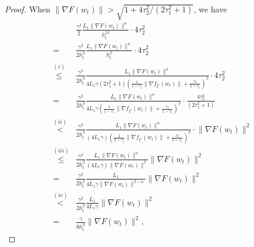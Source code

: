 \documentclass[10pt,a4paper]{amsart}
\begin{document}
\begin{proof}
    When $\big \|\nabla F(w_t) \big \| > \sqrt{1+{4\tau_2^2}/{(2\tau_1^2+1)}}$, we have
    \begin{align}
        &\frac{\gamma^2}{2} \frac{L_1 \big \|\nabla F(w_t) \big \|^{\alpha}}{h_t^{2\beta}}\cdot {4\tau_2^2} \nonumber\\
        =& \frac{\gamma^2}{2h_t^{\beta}} \frac{L_1 \big \|\nabla F(w_t) \big \|^{\alpha}}{h_t^{\beta}}\cdot {4\tau_2^2} \nonumber \\
        \overset{(i)}{\leq}&\frac{\gamma^2}{2h_t^{\beta}} \frac{L_1 \big \|\nabla F(w_t) \big \|^{\alpha}}{4L_1\gamma(2\tau_1^2+1)(\frac{1}{1-\tau_1}\|\nabla f_{\xi'}(w_t) \|+\frac{\tau_2}{1-\tau_1})^{\beta}}\cdot 4\tau_2^2 \nonumber \\
        =& \frac{\gamma^2}{2h_t^{\beta}} \frac{L_1 \big \|\nabla F(w_t) \big \|^{\alpha}}{4L_1\gamma(\frac{1}{1-\tau_1}\|\nabla f_{\xi'}(w_t) \|+\frac{\tau_2}{1-\tau_1})^{\beta}}\cdot \frac{4\tau_2^2}{(2\tau_1^2+1)} \nonumber \\
        \overset{(ii)}{<}& \frac{\gamma^2}{2h_t^{\beta}} \frac{L_1 \big \|\nabla F(w_t) \big \|^{\alpha}}{(4L_1\gamma)(\frac{1}{1-\tau_1}\big \|\nabla f_{\xi'}(w_t) \big \|+\frac{\tau_2}{1-\tau_1})^{\beta}} \cdot \big \|\nabla F(w_t) \big \|^2 \nonumber \\
        \overset{(iii)}{\leq}& \frac{\gamma^2}{2h_t^{\beta}} \frac{L_1 \big \|\nabla F(w_t) \big \|^{\alpha}}{(4L_1\gamma)\big \|\nabla F(w_t) \big \|^{\beta}} \big \| \nabla F(w_t)\big \|^2\nonumber \\
        =& \frac{\gamma^2}{2h_t^{\beta}}\frac{L_1}{4L_1\gamma \big \|\nabla F(w_t) \big \|^{\beta - \alpha}}\big \|\nabla F(w_t) \big \|^2 \nonumber \\
        \overset{(iv)}{<}& \frac{\gamma^2}{2h_t^{\beta}} \frac{L_1}{4L_1\gamma} \big \|\nabla F(w_t) \big \|^{2}\nonumber \\
        =& \frac{\gamma}{8h_t^{\beta}} \big \|\nabla F(w_t) \big \|^2, 

\end{align}
\end{proof}
\end{document}
